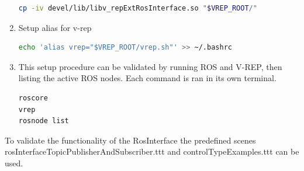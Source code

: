 \documentclass{article}
\begin{document}
\begin{multicols*}{2}
\begin{enumerate}
\begin{lstlisting}[language=bash,breaklines=true]
cp -iv devel/lib/libv_repExtRosInterface.so "$VREP_ROOT/"
\end{lstlisting}
\item Setup alias for v-rep 
\begin{lstlisting}[language=bash,breaklines=true]
echo 'alias vrep="$VREP_ROOT/vrep.sh"' >> ~/.bashrc 
\end{lstlisting}
\item This setup procedure can be validated by running ROS and V-REP, then listing the active ROS nodes. Each command is ran in its own terminal. 
\begin{lstlisting}[language=bash,breaklines=true]
roscore
vrep
rosnode list
\end{lstlisting}
\end{enumerate}
To validate the functionality of the RosInterface the predefined scenes rosInterfaceTopicPublisherAndSubscriber.ttt and controlTypeExamples.ttt can be used. 
\end{multicols*}
 
\end{document}
